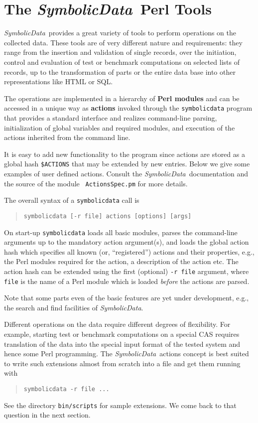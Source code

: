 \documentclass[11pt]{article}
\newcommand{\SD}{{\em Symbo\-lic\-Data}}
\begin{document}
\section{The \SD\ Perl Tools}

\SD\ provides a great variety of tools to perform operations on the
collected data. These tools are of very different nature and
requirements: they range from the insertion and validation of single
records, over the initiation, control and evaluation of test or
benchmark computations on selected lists of records, up to the
transformation of parts or the entire data base into other
representations like HTML or SQL.

The operations are implemented in a hierarchy of {\bf Perl modules}
and can be accessed in a unique way as {\bf actions} invoked through
the {\tt symbolicdata} program that provides a standard interface and
realizes command-line parsing, initialization of global variables and
required modules, and execution of the actions inherited from the
command line.

It is easy to add new functionality to the program since actions are
stored as a global hash {\tt \$ACTIONS} that may be extended by new
entries.  Below we give some examples of user defined actions.
Consult the \SD\ documentation and the source of the module {\tt
ActionsSpec.pm} for more details.

The overall syntax of a {\tt symbolicdata} call is
\begin{quote}
\mbox{\tt symbolicdata [-r file] actions [options] [args]}
\end{quote}

On start-up {\tt symbolicdata} loads all basic modules, parses
the command-line arguments up to the mandatory action
argument(s), and loads the global action hash which specifies all
known (or, ``registered'') actions and their properties, e.g.,
the Perl modules required for the action, a description of the
action etc. The action hash can be extended using the first
(optional) {\tt -r file} argument, where {\tt file} is the name
of a Perl module which is loaded {\em before} the actions are
parsed.  

Note that some parts even of the basic features are yet
under development, e.g., the search and find facilities of \SD.

Different operations on the data require different degrees of
flexibility. For example, starting test or benchmark computations
on a special CAS requires translation of the data into the
special input format of the tested system and hence some Perl
programming.  The \SD\ actions concept is best suited to write
such extensions almost from scratch into a file and get them
running with 
\begin{quote}
{\tt symbolicdata -r file ...}
\end{quote}
See the directory {\tt bin/scripts} for sample extensions.  We
come back to that question in the next section.
\end{document}

